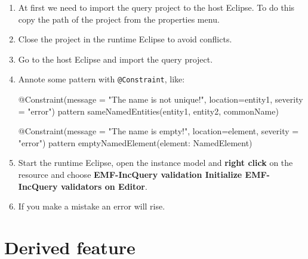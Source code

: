 \documentclass[]{report}
\newenvironment{Shaded}{}{}
\newcommand{\StringTok}[1]{\textcolor[rgb]{0.25,0.44,0.63}{{#1}}}
\newcommand{\FunctionTok}[1]{\textcolor[rgb]{0.02,0.16,0.49}{{#1}}}
\newcommand{\NormalTok}[1]{{#1}}
\begin{document}
\begin{enumerate}
\def\labelenumi{\arabic{enumi}.}
\item
  At first we need to import the query project to the host Eclipse. To
  do this copy the path of the project from the properties menu.
\item
  Close the project in the runtime Eclipse to avoid conflicts.
\item
  Go to the host Eclipse and import the query project.
\item
  Annote some pattern with \texttt{@Constraint}, like:

\begin{Shaded}
\begin{Highlighting}[]
\FunctionTok{@Constraint}\NormalTok{(message = }\StringTok{"The name is not unique!"}\NormalTok{, location=entity1, severity = }\StringTok{"error"}\NormalTok{)}
\NormalTok{pattern }\FunctionTok{sameNamedEntities}\NormalTok{(entity1, entity2, commonName)}

\FunctionTok{@Constraint}\NormalTok{(message = }\StringTok{"The name is empty!"}\NormalTok{, location=element, severity = }\StringTok{"error"}\NormalTok{)}
\NormalTok{pattern }\FunctionTok{emptyNamedElement}\NormalTok{(element: NamedElement)}
\end{Highlighting}
\end{Shaded}
\item
  Start the runtime Eclipse, open the instance model and \textbf{right
  click} on the resource and choose \textbf{EMF-IncQuery validation
  \textbar{} Initialize EMF-IncQuery validators on Editor}.
\item
  If you make a mistake an error will rise.
\end{enumerate}

\section{Derived feature}
\end{document}
